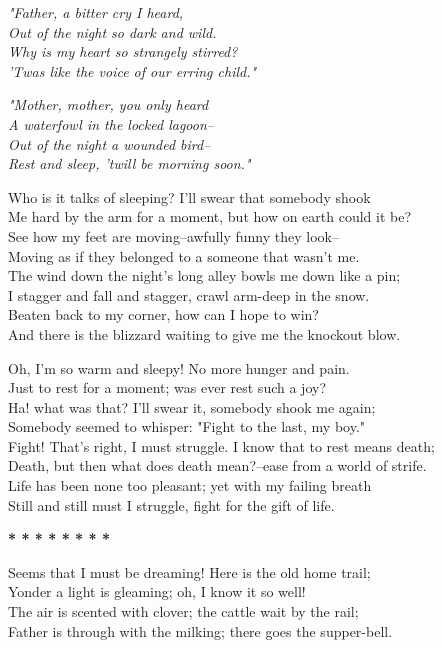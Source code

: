 \begin{poemblock}
\textit{
"Father, a bitter cry I heard,\\
\idt Out of the night so dark and wild.\\
Why is my heart so strangely stirred?\\
\idt 'Twas like the voice of our erring child."
}

\textit{
"Mother, mother, you only heard\\
\idt A waterfowl in the locked lagoon--\\
Out of the night a wounded bird--\\
\idt Rest and sleep, 'twill be morning soon."
}

Who is it talks of sleeping?  I'll swear that somebody shook\\
\idt Me hard by the arm for a moment, but how on earth could it be?\\
See how my feet are moving--awfully funny they look--\\
\idt Moving as if they belonged to a someone that wasn't me.\\
The wind down the night's long alley bowls me down like a pin;\\
\idt I stagger and fall and stagger, crawl arm-deep in the snow.\\
Beaten back to my corner, how can I hope to win?\\
\idt And there is the blizzard waiting to give me the knockout blow.

Oh, I'm so warm and sleepy!  No more hunger and pain.\\
\idt Just to rest for a moment; was ever rest such a joy?\\
Ha! what was that?  I'll swear it, somebody shook me again;\\
\idt Somebody seemed to whisper:  "Fight to the last, my boy."\\
Fight!  That's right, I must struggle.  I know that to rest means death;\\
\idt Death, but then what does death mean?--ease from a world of strife.\\
Life has been none too pleasant; yet with my failing breath\\
\idt Still and still must I struggle, fight for the gift of life.\\

\centerline{\textbf{*   *   *   *   *   *   *   *}}

Seems that I must be dreaming!  Here is the old home trail;\\
\idt Yonder a light is gleaming; oh, I know it so well!\\
The air is scented with clover; the cattle wait by the rail;\\
\idt Father is through with the milking; there goes the supper-bell.\\


\end{poemblock}
